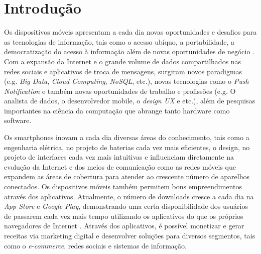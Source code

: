 

\section{Introdução}\label{sec:introducao}
Os dispositivos móveis apresentam a cada dia novas oportunidades e desafios para as tecnologias de informação, tais como o acesso ubíquo, a portabilidade, a democratização do acesso à informação além de novas oportunidades de negócio \cite{levy_2002}. Com a expansão da Internet e o grande volume de dados compartilhados nas redes sociais e aplicativos de troca de mensagens, surgiram novos paradigmas (e.g. \textit{Big Data}, \textit{Cloud Computing}, \textit{NoSQL}, etc.), novas tecnologias como o \textit{Push Notification} e também novas oportunidades de trabalho e profissões (e.g. O analista de dados, o desenvolvedor mobile, o \textit{design UX} e etc.), além de pesquisas importantes na ciência da computação que abrange tanto hardware como software.\par

Os smartphones inovam a cada dia diversas áreas do conhecimento, tais como a engenharia elétrica, no projeto de baterias cada vez mais eficientes, o design, no projeto de interfaces cada vez mais intuitivas e influenciam diretamente na evolução da Internet e dos meios de comunicação como as redes móveis que expandem as áreas de cobertura para atender ao crescente número de aparelhos conectados. Os dispositivos móveis também permitem bons empreendimentos através dos aplicativos. Atualmente, o número de downloads cresce a cada dia na \textit{App Store} e \textit{Google Play}, demonstrando uma certa disponibilidade dos usuários de passarem cada vez mais tempo utilizando os aplicativos do que os próprios navegadores de Internet \cite{D&T}. Através dos aplicativos, é possível monetizar e gerar receitas via marketing digital e desenvolver soluções para diversos segmentos, tais como o \textit{e-commerce}, redes sociais e sistemas de informação.\par


